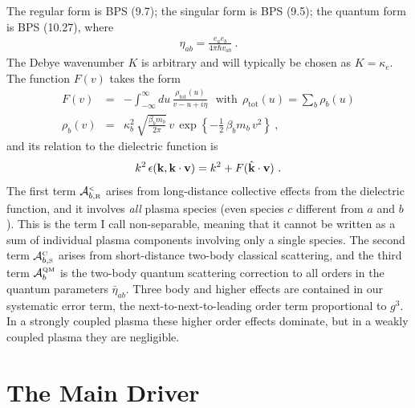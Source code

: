 \documentclass[preprint,12pt,eqsecnum,nofootinbib,amsmath,amssymb]{revtex4}
\newcommand{\smC}{{\rm\scriptscriptstyle C}}
\newcommand{\smR}{{\rm\scriptscriptstyle R}}
\newcommand{\smS}{{\rm\scriptscriptstyle S}}
\newcommand{\smQM}{{\rm\scriptscriptstyle QM}}
\newcommand{\smLT}{{\rm\scriptscriptstyle <}}
\begin{document}
The regular form is  BPS (9.7); the singular form is BPS (9.5);
the quantum form is BPS (10.27), where
\begin{eqnarray}
\eta_{ab}= \frac{e_a e_b}{4\pi\hbar v_{ab}} \ .
\end{eqnarray}
The Debye wavenumber $K$ is arbitrary and will typically be chosen as
$K=\kappa_e$. The function $F(v)$ takes the form
\begin{eqnarray}
  F(v) 
  &=& 
  -\int_{-\infty}^\infty \! du \, 
  \frac{\rho_\text{tot}(u)}{v - u + i\eta} 
  ~~~\text{with}~~
  \rho_\text{tot}(u)=\sum_b\rho_b(u)
\label{Fdef}
\\[5pt]
  \rho_b(v) 
  &=& 
  \kappa_b^2\,\sqrt{\frac{\beta_b m_b}{2\pi}}\, v\,
  \exp\!\left\{-\frac{1}{2}\,\beta_b m_b\, v^2\right\} \ ,
\label{rhototdef}
\end{eqnarray}
and its relation to the dielectric function is 
\begin{eqnarray}
  k^2 \, \epsilon({\bf k} , {\bf k}\cdot {\bf v} ) = k^2 + 
  F(\hat{\bf k} \cdot {\bf v}) \ .
\end{eqnarray}
The first term ${\cal A}_{b ,\smR}^\smLT$ arises from long-distance
collective effects from the dielectric function, and it involves {\em
all} plasma species (even species $c$ different from $a$ and $b$).
This is the term I call non-separable, meaning that it cannot be
written as a sum of individual plasma components involving only a
single species. The second term ${\cal A}_{b ,\smS}^\smC$ arises from
short-distance two-body classical scattering, and the third term
${\cal A}_{b}^\smQM$ is the two-body quantum scattering correction to
all orders in the quantum parameters $\bar\eta_{ab}$. Three body and
higher effects are contained in our systematic error term, the
next-to-next-to-leading order term proportional to $g^3$. In a
strongly coupled plasma these higher order effects dominate, but in a
weakly coupled plasma they are negligible.

\pagebreak
\section{The Main Driver}
\end{document}
